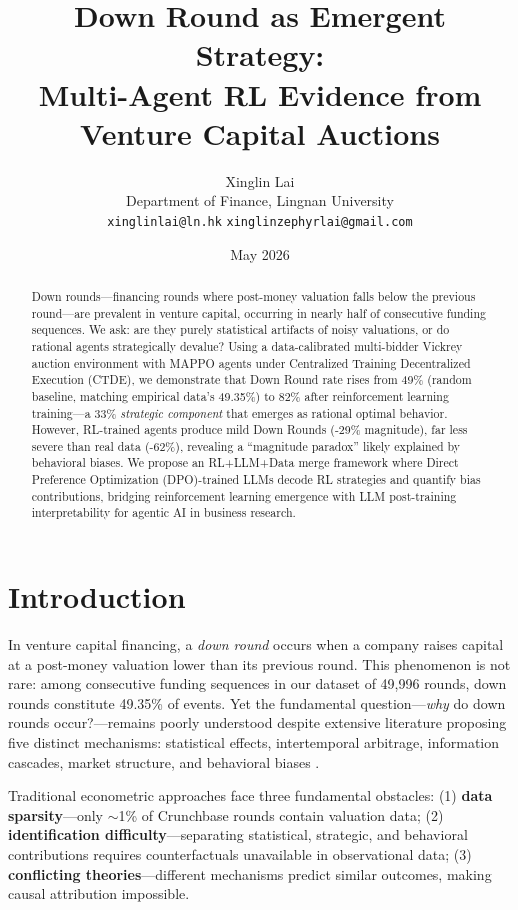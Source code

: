 \documentclass[11pt,a4paper]{article}
\title{\textbf{Down Round as Emergent Strategy:\\Multi-Agent RL Evidence from Venture Capital Auctions}}
\author{
  Xinglin Lai\\
  Department of Finance, Lingnan University\\
  \texttt{xinglinlai@ln.hk} \quad \texttt{xinglinzephyrlai@gmail.com}
}
\date{May 2026}
\begin{document}
\maketitle

\begin{abstract}
Down rounds---financing rounds where post-money valuation falls below the previous round---are prevalent in venture capital, occurring in nearly half of consecutive funding sequences. We ask: are they purely statistical artifacts of noisy valuations, or do rational agents strategically devalue? Using a data-calibrated multi-bidder Vickrey auction environment with MAPPO agents under Centralized Training Decentralized Execution (CTDE), we demonstrate that Down Round rate rises from 49\% (random baseline, matching empirical data's 49.35\%) to 82\% after reinforcement learning training---a 33\% \emph{strategic component} that emerges as rational optimal behavior. However, RL-trained agents produce mild Down Rounds (-29\% magnitude), far less severe than real data (-62\%), revealing a ``magnitude paradox'' likely explained by behavioral biases. We propose an RL+LLM+Data merge framework where Direct Preference Optimization (DPO)-trained LLMs decode RL strategies and quantify bias contributions, bridging reinforcement learning emergence with LLM post-training interpretability for agentic AI in business research.
\end{abstract}

\section{Introduction}

In venture capital financing, a \emph{down round} occurs when a company raises capital at a post-money valuation lower than its previous round. This phenomenon is not rare: among consecutive funding sequences in our dataset of 49,996 rounds, down rounds constitute 49.35\% of events. Yet the fundamental question---\emph{why} do down rounds occur?---remains poorly understood despite extensive literature proposing five distinct mechanisms: statistical effects, intertemporal arbitrage, information cascades, market structure, and behavioral biases \citep{milgrom1982,gompers1998,kahneman1979}.

Traditional econometric approaches face three fundamental obstacles: (1) \textbf{data sparsity}---only $\sim$1\% of Crunchbase rounds contain valuation data; (2) \textbf{identification difficulty}---separating statistical, strategic, and behavioral contributions requires counterfactuals unavailable in observational data; (3) \textbf{conflicting theories}---different mechanisms predict similar outcomes, making causal attribution impossible.
\end{document}
